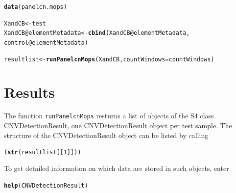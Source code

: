 \documentclass[article]{bioinf}\usepackage[]{graphicx}\usepackage[]{color}
\makeatletter
\newcommand{\hlnum}[1]{\textcolor[rgb]{0.686,0.059,0.569}{#1}}%
\newcommand{\hlopt}[1]{\textcolor[rgb]{0,0,0}{#1}}%
\newcommand{\hlstd}[1]{\textcolor[rgb]{0.345,0.345,0.345}{#1}}%
\newcommand{\hlkwb}[1]{\textcolor[rgb]{0.69,0.353,0.396}{#1}}%
\newcommand{\hlkwc}[1]{\textcolor[rgb]{0.333,0.667,0.333}{#1}}%
\newcommand{\hlkwd}[1]{\textcolor[rgb]{0.737,0.353,0.396}{\textbf{#1}}}%
\newenvironment{kframe}{%
 \def\at@end@of@kframe{}%
 \ifinner\ifhmode%
  \def\at@end@of@kframe{\end{minipage}}%
  \begin{minipage}{\columnwidth}%
 \fi\fi%
 \def\FrameCommand##1{\hskip\@totalleftmargin \hskip-\fboxsep
 \colorbox{shadecolor}{##1}\hskip-\fboxsep
     \hskip-\linewidth \hskip-\@totalleftmargin \hskip\columnwidth}%
 \MakeFramed {\advance\hsize-\width
   \@totalleftmargin\z@ \linewidth\hsize
   \@setminipage}}%
 {\par\unskip\endMakeFramed%
 \at@end@of@kframe}
\newenvironment{knitrout}{}{} %
\makeatother
\begin{document}
\begin{knitrout}
\color{fgcolor}\begin{kframe}
\begin{alltt}
\hlkwd{data}\hlstd{(panelcn.mops)}

\hlstd{XandCB} \hlkwb{<-} \hlstd{test}
\hlstd{XandCB}\hlopt{@}\hlkwc{elementMetadata} \hlkwb{<-} \hlkwd{cbind}\hlstd{(XandCB}\hlopt{@}\hlkwc{elementMetadata}\hlstd{,}
                                \hlstd{control}\hlopt{@}\hlkwc{elementMetadata}\hlstd{)}

\hlstd{resultlist} \hlkwb{<-} \hlkwd{runPanelcnMops}\hlstd{(XandCB,} \hlkwc{countWindows} \hlstd{= countWindows)}
\end{alltt}
\end{kframe}
\end{knitrout}



\section{Results}
\label{s:results}
The function \verb+runPanelcnMops+ resturns a list of objects of the S4 class 
CNVDetectionResult, one CNVDetectionResult object per test sample. 
The structure of the CNVDetectionResult object can be listed by calling
\begin{knitrout}
\color{fgcolor}\begin{kframe}
\begin{alltt}
\hlstd{(}\hlkwd{str}\hlstd{(resultlist[[}\hlnum{1}\hlstd{]]))}
\end{alltt}
\end{kframe}
\end{knitrout}

To get
detailed information on which data are stored in such objects, enter
\begin{knitrout}
\color{fgcolor}\begin{kframe}
\begin{alltt}
\hlkwd{help}\hlstd{(CNVDetectionResult)}
\end{alltt}
\end{kframe}
\end{knitrout}
\end{document}

